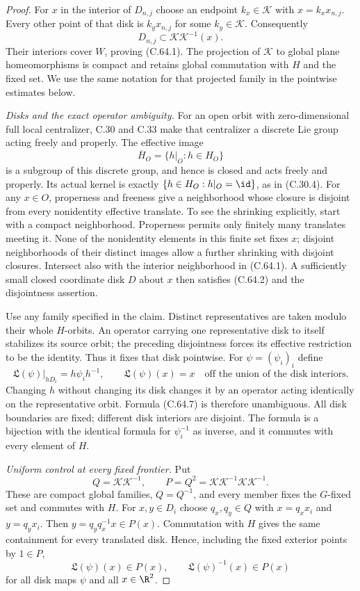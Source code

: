 \begin{proof}
For $x$ in the interior of $D_{n,j}$ choose an endpoint
$k_x\in\mathcal K$ with $x=k_xx_{n,j}$. Every other point
of that disk is $k_yx_{n,j}$ for some $k_y\in\mathcal K$.
Consequently
\[
       D_{n,j}\subset\mathcal K\mathcal K^{-1}(x).
                                                               \tag{C.64.6}
\]
Their interiors cover $W$, proving (C.64.1). The projection
of $\mathcal K$ to global plane homeomorphisms is compact
and retains global commutation with $H$ and the fixed set.
We use the same notation for that projected family in the
pointwise estimates below.

\emph{Disks and the exact operator ambiguity.}
For an open orbit with zero-dimensional full local centralizer,
C.30 and C.33 make that centralizer a discrete Lie group
acting freely and properly. The effective image
\[
 \overline H_O=\{h|_O:h\in H_O\}
\]
is a subgroup of this discrete group, and hence is closed
and acts freely and properly. Its actual kernel is exactly
$\{h\in H_O:h|_O=\id\}$, as in (C.30.4).
For any $x\in O$, properness and freeness give a neighborhood
whose closure is disjoint from every nonidentity effective
translate. To see the shrinking explicitly, start with a
compact neighborhood. Properness permits only finitely
many translates meeting it. None of the nonidentity elements
in this finite set fixes $x$; disjoint neighborhoods of their
distinct images allow a further shrinking with disjoint
closures. Intersect also with the interior neighborhood in
(C.64.1). A sufficiently small closed coordinate disk $D$
about $x$ then satisfies (C.64.2) and the disjointness assertion.

Use any family specified in the claim. Distinct representatives
are taken modulo their whole $H$-orbits. An operator carrying
one representative disk to itself stabilizes its source orbit;
the preceding disjointness forces its effective restriction
to be the identity. Thus it fixes that disk pointwise.
For $\psi=(\psi_i)_i$ define
\[
 \mathfrak L(\psi)|_{hD_i}=h\psi_i h^{-1},\qquad
 \mathfrak L(\psi)(x)=x
 \quad\text{off the union of the disk interiors}.        \tag{C.64.7}
\]
Changing $h$ without changing its disk changes it by an
operator acting identically on the representative orbit.
Formula (C.64.7) is therefore unambiguous. All disk boundaries
are fixed; different disk interiors are disjoint. The formula
is a bijection with the identical formula for $\psi_i^{-1}$
as inverse, and it commutes with every element of $H$.

\emph{Uniform control at every fixed frontier.}
Put
\[
          Q=\mathcal K\mathcal K^{-1},\qquad
          P=Q^2=\mathcal K\mathcal K^{-1}
                         \mathcal K\mathcal K^{-1}.      \tag{C.64.8}
\]
These are compact global families, $Q=Q^{-1}$, and every
member fixes the $G$-fixed set and commutes with $H$.
For $x,y\in D_i$ choose $q_x,q_y\in Q$ with
$x=q_xx_i$ and $y=q_yx_i$. Then
$y=q_yq_x^{-1}x\in P(x)$. Commutation with $H$ gives
the same containment for every translated disk. Hence,
including the fixed exterior points by $1\in P$,
\[
 \mathfrak L(\psi)(x)\in P(x),\qquad
 \mathfrak L(\psi)^{-1}(x)\in P(x)                        \tag{C.64.9}
\]
for all disk maps $\psi$ and all $x\in\R^2$.


\end{proof}
